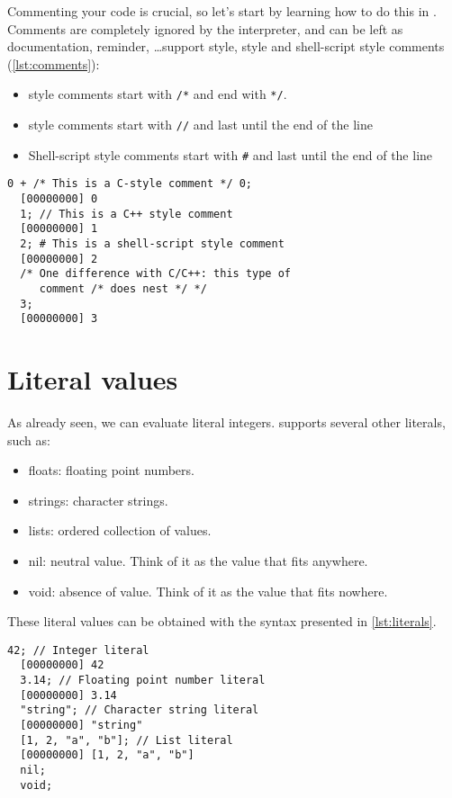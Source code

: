 \documentclass[openright,twoside,12pt]{report}
\begin{document}
Commenting your code is crucial, so let's start by learning how to do
this in \urbi. Comments are completely ignored by the interpreter, and
can be left as documentation, reminder, \ldots \urbi support \C style,
\Cxx style and shell-script style comments (\autoref{lst:comments}):

\begin{itemize}
\item \C style comments start with \texttt{/*} and end with \texttt{*/}.
\item \Cxx style comments start with \texttt{//} and last until the
  end of the line
\item Shell-script style comments start with \texttt{\#} and last
  until the end of the line
\end{itemize}


\begin{lstlisting}[caption=Comments in \urbi, label=lst:comments]
  0 + /* This is a C-style comment */ 0;
  [00000000] 0
  1; // This is a C++ style comment
  [00000000] 1
  2; # This is a shell-script style comment
  [00000000] 2
  /* One difference with C/C++: this type of
     comment /* does nest */ */
  3;
  [00000000] 3
\end{lstlisting}


\section{Literal values}

As already seen, we can evaluate literal integers. \urbi supports
several other literals, such as:

\begin{itemize}
\item floats: floating point numbers.
\item strings: character strings.
\item lists: ordered collection of values.
\item nil: neutral value. Think of it as the value that fits anywhere.
\item void: absence of value. Think of it as the value that fits nowhere.
\end{itemize}

These literal values can be obtained with the syntax presented in
\autoref{lst:literals}.

\begin{lstlisting}[caption=Literals,label=lst:literals]
  42; // Integer literal
  [00000000] 42
  3.14; // Floating point number literal
  [00000000] 3.14
  "string"; // Character string literal
  [00000000] "string"
  [1, 2, "a", "b"]; // List literal
  [00000000] [1, 2, "a", "b"]
  nil;
  void;
\end{lstlisting}
\end{document}
